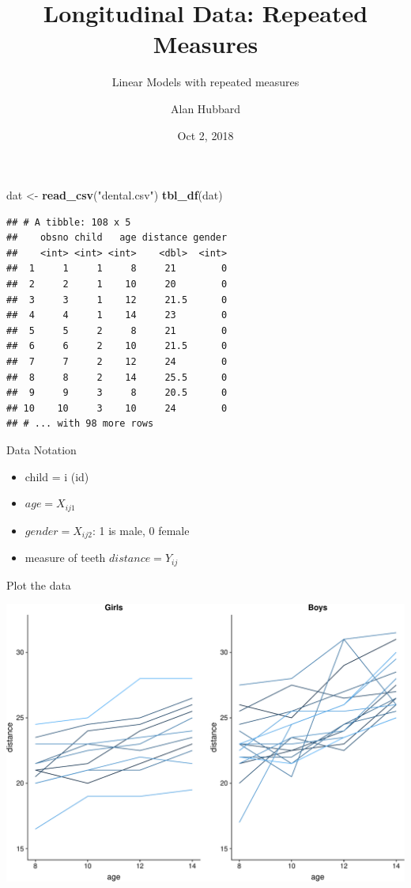 \documentclass[ignorenonframetext,]{beamer}
\title{Longitudinal Data: Repeated Measures}
\subtitle{Linear Models with repeated measures}
\author{Alan Hubbard}
\date{Oct 2, 2018}
\newenvironment{Shaded}{\begin{snugshade}}{\end{snugshade}}
\newcommand{\KeywordTok}[1]{\textcolor[rgb]{0.13,0.29,0.53}{\textbf{#1}}}
\newcommand{\StringTok}[1]{\textcolor[rgb]{0.31,0.60,0.02}{#1}}
\newcommand{\NormalTok}[1]{#1}
\providecommand{\tightlist}{%
  \setlength{\itemsep}{0pt}\setlength{\parskip}{0pt}}
\begin{document}
\frame{\titlepage}

\begin{frame}[fragile]

\begin{Shaded}
\begin{Highlighting}[]
\NormalTok{dat <-}\StringTok{ }\KeywordTok{read_csv}\NormalTok{(}\StringTok{"dental.csv"}\NormalTok{)}
\KeywordTok{tbl_df}\NormalTok{(dat)}
\end{Highlighting}
\end{Shaded}

\begin{verbatim}
## # A tibble: 108 x 5
##    obsno child   age distance gender
##    <int> <int> <int>    <dbl>  <int>
##  1     1     1     8     21        0
##  2     2     1    10     20        0
##  3     3     1    12     21.5      0
##  4     4     1    14     23        0
##  5     5     2     8     21        0
##  6     6     2    10     21.5      0
##  7     7     2    12     24        0
##  8     8     2    14     25.5      0
##  9     9     3     8     20.5      0
## 10    10     3    10     24        0
## # ... with 98 more rows
\end{verbatim}

\end{frame}

\begin{frame}{Data Notation}

\begin{itemize}
\tightlist
\item
  child = i (id)
\item
  \(age = X_{ij1}\)
\item
  \(gender = X_{ij2}\): 1 is male, 0 female
\item
  measure of teeth \(distance = Y_{ij}\)
\end{itemize}

\end{frame}

\begin{frame}{Plot the data}

\includegraphics{Chapter5JustCodePart1_files/figure-beamer/plot1-1.pdf}

\end{frame}
\end{document}
